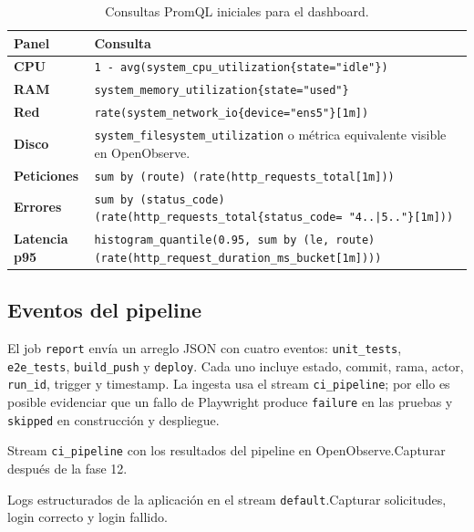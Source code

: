 \documentclass[12pt,a4paper]{article}
\begin{document}
\begin{table}[H]
  \centering
  \caption{Consultas PromQL iniciales para el dashboard.}
  \small
  \begin{tabularx}{\textwidth}{>{\bfseries}p{3.6cm} X}
    \toprule
    Panel & Consulta \\
    \midrule
    CPU & \texttt{1 - avg(system\_cpu\_utilization\{state="idle"\})} \\
    RAM & \texttt{system\_memory\_utilization\{state="used"\}} \\
    Red & \texttt{rate(system\_network\_io\{device="ens5"\}[1m])} \\
    Disco & \texttt{system\_filesystem\_utilization} o métrica equivalente visible en OpenObserve. \\
    Peticiones & \texttt{sum by (route) (rate(http\_requests\_total[1m]))} \\
    Errores & \texttt{sum by (status\_code) (rate(http\_requests\_total\{status\_code=~"4..|5.."\}[1m]))} \\
    Latencia p95 & \texttt{histogram\_quantile(0.95, sum by (le, route) (rate(http\_request\_duration\_ms\_bucket[1m])))} \\
    \bottomrule
  \end{tabularx}
\end{table}

\subsection{Eventos del pipeline}

El job \texttt{report} envía un arreglo JSON con cuatro eventos: \texttt{unit\_tests}, \texttt{e2e\_tests}, \texttt{build\_push} y \texttt{deploy}. Cada uno incluye estado, commit, rama, actor, \texttt{run\_id}, trigger y timestamp. La ingesta usa el stream \texttt{ci\_pipeline}; por ello es posible evidenciar que un fallo de Playwright produce \texttt{failure} en las pruebas y \texttt{skipped} en construcción y despliegue.

\begin{pendingfigure}{Stream \texttt{ci\_pipeline} con los resultados del pipeline en OpenObserve.}{Capturar después de la fase 12.}
\label{fig:cipipeline}
\end{pendingfigure}

\begin{pendingfigure}{Logs estructurados de la aplicación en el stream \texttt{default}.}{Capturar solicitudes, login correcto y login fallido.}
\label{fig:logs}
\end{pendingfigure}
\end{document}
